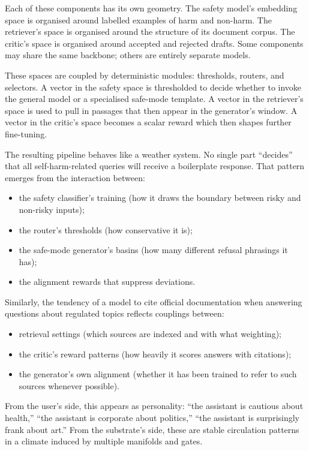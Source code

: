 \documentclass[12pt,a4paper]{article}
\begin{document}
Each of these components has its own geometry. The safety model's embedding space is organised around labelled examples of harm and non-harm. The retriever's space is organised around the structure of its document corpus. The critic's space is organised around accepted and rejected drafts. Some components may share the same backbone; others are entirely separate models.

These spaces are coupled by deterministic modules: thresholds, routers, and selectors. A vector in the safety space is thresholded to decide whether to invoke the general model or a specialised safe-mode template. A vector in the retriever's space is used to pull in passages that then appear in the generator's window. A vector in the critic's space becomes a scalar reward which then shapes further fine-tuning.

The resulting pipeline behaves like a weather system. No single part ``decides'' that all self-harm-related queries will receive a boilerplate response. That pattern emerges from the interaction between:

\begin{itemize}
  \item the safety classifier's training (how it draws the boundary between risky and non-risky inputs);
  \item the router's thresholds (how conservative it is);
  \item the safe-mode generator's basins (how many different refusal phrasings it has);
  \item the alignment rewards that suppress deviations.
\end{itemize}

Similarly, the tendency of a model to cite official documentation when answering questions about regulated topics reflects couplings between:

\begin{itemize}
  \item retrieval settings (which sources are indexed and with what weighting);
  \item the critic's reward patterns (how heavily it scores answers with citations);
  \item the generator's own alignment (whether it has been trained to refer to such sources whenever possible).
\end{itemize}

From the user's side, this appears as personality: ``the assistant is cautious about health,'' ``the assistant is corporate about politics,'' ``the assistant is surprisingly frank about art.'' From the substrate's side, these are stable circulation patterns in a climate induced by multiple manifolds and gates.
\end{document}
